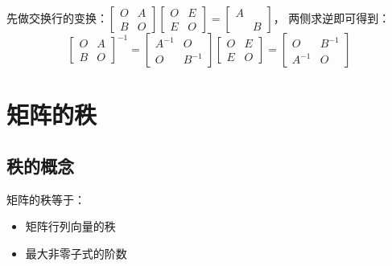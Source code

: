 \begin{solution}
  先做交换行的变换：$\left[
    \begin{array}{cc}
      O&A\\
      B&O
    \end{array}
  \right]\left[
    \begin{array}{cc}
      O&E\\
      E&O
    \end{array}
  \right] = \left[
    \begin{array}{cc}
      A&\\
      &B
    \end{array}
  \right]$，
  两侧求逆即可得到：
  \begin{equation*}
    \left[
      \begin{array}{cc}
        O&A\\
        B&O
      \end{array}
    \right]^{-1} =  \left[
      \begin{array}{cc}
        A^{-1}&O\\
        O&B^{-1}
      \end{array}
    \right]
    \left[
      \begin{array}{cc}
        O&E\\
        E&O
      \end{array}
    \right]
    = \left[
      \begin{array}{cc}
        O&B^{-1}\\
        A^{-1}&O
      \end{array}
    \right]
  \end{equation*}
\end{solution}

\section{矩阵的秩}

\subsection{秩的概念}

\begin{definition}[矩阵的秩]
  矩阵的秩等于：
  \begin{itemize}
  \item 矩阵行列向量的秩
  \item 最大非零子式的阶数
  \end{itemize}
\end{definition}




